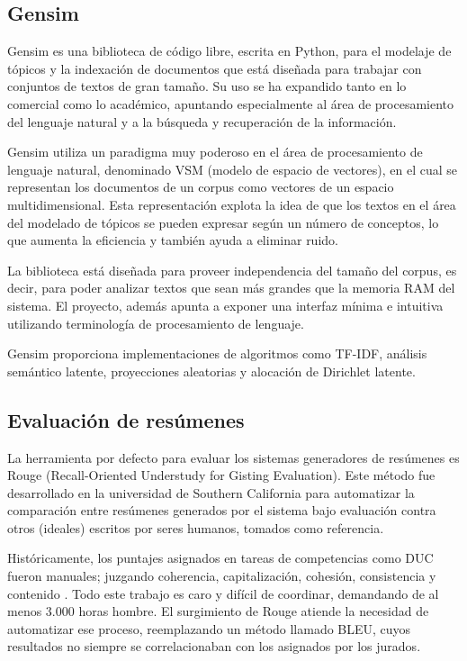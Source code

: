 \documentclass[a4paper]{article}
\begin{document}
\subsection{Gensim}
Gensim es una biblioteca de código libre, escrita en Python, para el modelaje de tópicos y la indexación de documentos que está diseñada para trabajar con conjuntos de textos de gran tamaño. Su uso se ha expandido tanto en lo comercial como lo académico, apuntando especialmente al área de procesamiento del lenguaje natural y a la búsqueda y recuperación de la información.

Gensim utiliza un paradigma muy poderoso en el área de procesamiento de lenguaje natural, denominado VSM (modelo de espacio de vectores), en el cual se representan los documentos de un corpus como vectores de un espacio multidimensional. Esta representación explota la idea de que los textos en el área del modelado de tópicos se pueden expresar según un número de conceptos, lo que aumenta la eficiencia y también ayuda a eliminar ruido.

La biblioteca está diseñada para proveer independencia del tamaño del corpus, es decir, para poder analizar textos que sean más grandes que la memoria RAM del sistema. El proyecto, además apunta a exponer una interfaz mínima e intuitiva utilizando terminología de procesamiento de lenguaje.

Gensim proporciona implementaciones de algoritmos como TF-IDF, análisis semántico latente, proyecciones aleatorias y alocación de Dirichlet latente.


\subsection{Evaluación de resúmenes}
La herramienta por defecto para evaluar los sistemas generadores de resúmenes es Rouge (Recall-Oriented Understudy for Gisting Evaluation). Este método fue desarrollado en la universidad de Southern California para automatizar la comparación entre resúmenes generados por el sistema bajo evaluación contra otros (ideales) escritos por seres humanos, tomados como referencia.

Históricamente, los puntajes asignados en tareas de competencias como DUC fueron manuales; juzgando coherencia, capitalización, cohesión, consistencia y contenido \cite{duc2002}. Todo este trabajo es caro y difícil de coordinar, demandando de al menos 3.000 horas hombre. El surgimiento de Rouge atiende la necesidad de automatizar ese proceso, reemplazando un método llamado BLEU, cuyos resultados no siempre se correlacionaban con los asignados por los jurados.
\end{document}
